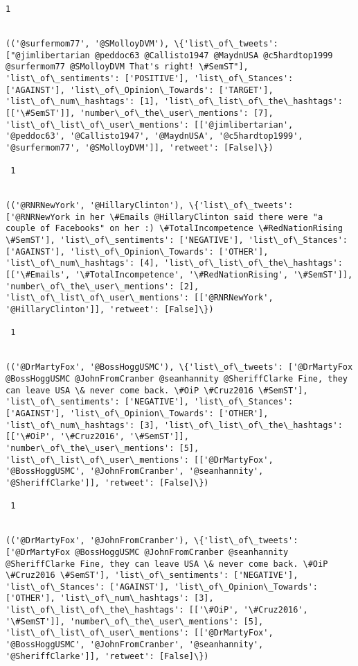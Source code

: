 \documentclass[11pt]{article}
\begin{document}
\begin{Verbatim}[commandchars=\\\{\}]
 1
 

(('@surfermom77', '@SMolloyDVM'), \{'list\_of\_tweets': ["@jimlibertarian @peddoc63 @Callisto1947 @MaydnUSA @c5hardtop1999 @surfermom77 @SMolloyDVM That's right! \#SemST"], 'list\_of\_sentiments': ['POSITIVE'], 'list\_of\_Stances': ['AGAINST'], 'list\_of\_Opinion\_Towards': ['TARGET'], 'list\_of\_num\_hashtags': [1], 'list\_of\_list\_of\_the\_hashtags': [['\#SemST']], 'number\_of\_the\_user\_mentions': [7], 'list\_of\_list\_of\_user\_mentions': [['@jimlibertarian', '@peddoc63', '@Callisto1947', '@MaydnUSA', '@c5hardtop1999', '@surfermom77', '@SMolloyDVM']], 'retweet': [False]\})

 1
 

(('@RNRNewYork', '@HillaryClinton'), \{'list\_of\_tweets': ['@RNRNewYork in her \#Emails @HillaryClinton said there were "a couple of Facebooks" on her :) \#TotalIncompetence \#RedNationRising \#SemST'], 'list\_of\_sentiments': ['NEGATIVE'], 'list\_of\_Stances': ['AGAINST'], 'list\_of\_Opinion\_Towards': ['OTHER'], 'list\_of\_num\_hashtags': [4], 'list\_of\_list\_of\_the\_hashtags': [['\#Emails', '\#TotalIncompetence', '\#RedNationRising', '\#SemST']], 'number\_of\_the\_user\_mentions': [2], 'list\_of\_list\_of\_user\_mentions': [['@RNRNewYork', '@HillaryClinton']], 'retweet': [False]\})

 1
 

(('@DrMartyFox', '@BossHoggUSMC'), \{'list\_of\_tweets': ['@DrMartyFox @BossHoggUSMC @JohnFromCranber @seanhannity @SheriffClarke Fine, they can leave USA \& never come back. \#OiP \#Cruz2016 \#SemST'], 'list\_of\_sentiments': ['NEGATIVE'], 'list\_of\_Stances': ['AGAINST'], 'list\_of\_Opinion\_Towards': ['OTHER'], 'list\_of\_num\_hashtags': [3], 'list\_of\_list\_of\_the\_hashtags': [['\#OiP', '\#Cruz2016', '\#SemST']], 'number\_of\_the\_user\_mentions': [5], 'list\_of\_list\_of\_user\_mentions': [['@DrMartyFox', '@BossHoggUSMC', '@JohnFromCranber', '@seanhannity', '@SheriffClarke']], 'retweet': [False]\})

 1
 

(('@DrMartyFox', '@JohnFromCranber'), \{'list\_of\_tweets': ['@DrMartyFox @BossHoggUSMC @JohnFromCranber @seanhannity @SheriffClarke Fine, they can leave USA \& never come back. \#OiP \#Cruz2016 \#SemST'], 'list\_of\_sentiments': ['NEGATIVE'], 'list\_of\_Stances': ['AGAINST'], 'list\_of\_Opinion\_Towards': ['OTHER'], 'list\_of\_num\_hashtags': [3], 'list\_of\_list\_of\_the\_hashtags': [['\#OiP', '\#Cruz2016', '\#SemST']], 'number\_of\_the\_user\_mentions': [5], 'list\_of\_list\_of\_user\_mentions': [['@DrMartyFox', '@BossHoggUSMC', '@JohnFromCranber', '@seanhannity', '@SheriffClarke']], 'retweet': [False]\})


\end{Verbatim}
\end{document}
